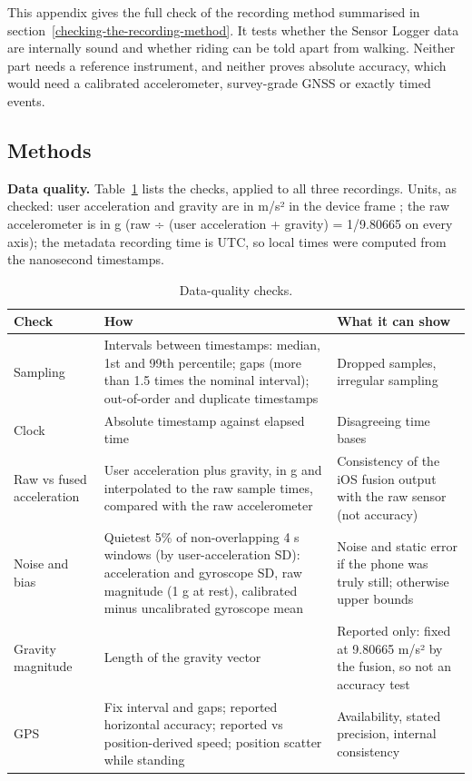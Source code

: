 This appendix gives the full check of the recording method summarised in
section~\ref{checking-the-recording-method}. It tests whether the Sensor Logger data are
internally sound and whether riding can be told apart from walking. Neither part needs a
reference instrument, and neither proves absolute accuracy, which would need a calibrated
accelerometer, survey-grade GNSS or exactly timed events.

\subsection{Methods}

\textbf{Data quality.} Table~\ref{tab:Bchecks} lists the checks, applied to all three
recordings. Units, as checked: user acceleration and gravity are in m/s² in the device
frame \autocite{apple_cmdevicemotion}; the raw accelerometer is in g
\autocite{apple_cmacceleration} (raw ÷ (user acceleration + gravity) = 1/9.80665 on every
axis); the metadata recording time is UTC, so local times were computed from the
nanosecond timestamps.

\begin{table}[htbp]
\centering\small
\caption{Data-quality checks.}\label{tab:Bchecks}
\begin{tabular}{@{}p{30mm}p{72mm}p{50mm}@{}}
\toprule
Check & How & What it can show \\
\midrule
Sampling & Intervals between timestamps: median, 1st and 99th percentile; gaps (more than 1.5 times the nominal interval); out-of-order and duplicate timestamps & Dropped samples, irregular sampling \\
Clock & Absolute timestamp against elapsed time & Disagreeing time bases \\
Raw vs fused acceleration & User acceleration plus gravity, in g and interpolated to the raw sample times, compared with the raw accelerometer & Consistency of the iOS fusion output with the raw sensor (not accuracy) \\
Noise and bias & Quietest 5\% of non-overlapping 4 s windows (by user-acceleration SD): acceleration and gyroscope SD, raw magnitude (1 g at rest), calibrated minus uncalibrated gyroscope mean & Noise and static error if the phone was truly still; otherwise upper bounds \\
Gravity magnitude & Length of the gravity vector & Reported only: fixed at 9.80665 m/s² by the fusion, so not an accuracy test \\
GPS & Fix interval and gaps; reported horizontal accuracy; reported vs position-derived speed; position scatter while standing & Availability, stated precision, internal consistency \\
\bottomrule
\end{tabular}
\end{table}

